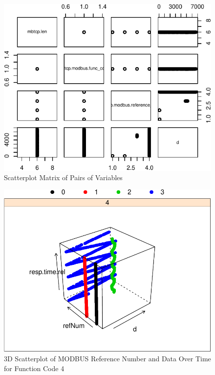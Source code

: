 \documentclass[11pt,]{article}
\begin{document}
\begin{figure}[h]

{\centering \includegraphics{thesis_files/figure-latex/unnamed-chunk-33-1} 

}

\caption{Scatterplot Matrix of Pairs of Variables}\label{fig:unnamed-chunk-33}
\end{figure}

\clearpage

\begin{figure}[h]

{\centering \includegraphics{thesis_files/figure-latex/unnamed-chunk-34-1} 

}

\caption{3D Scatterplot of MODBUS Reference Number
 and Data Over Time for Function Code 4}\label{fig:unnamed-chunk-34}
\end{figure}
\end{document}
